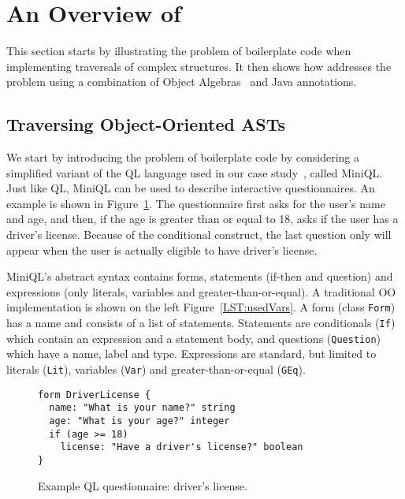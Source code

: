 \section{An Overview of \name}\label{subsec:overview}

This section starts by illustrating the problem of boilerplate code when implementing
traversals of complex structures. It then shows how \name addresses
the problem using a combination of Object Algebras~\cite{bruno12oa}
and Java annotations.

\subsection{Traversing Object-Oriented ASTs  }



We start by introducing the problem of boilerplate code by considering
a simplified variant of the QL language used in our case
study~\cite{gouseti14extensible}, called MiniQL.  Just like QL, MiniQL
can be used to describe interactive questionnaires. An example is
shown in Figure~\ref{driver_license}.  The questionnaire first asks
for the user's name and age, and then, if the age is greater than or
equal to 18, asks if the user has a driver's license.  Because of the
conditional construct, the last question only will appear when the
user is actually eligible to have driver's license.

MiniQL's abstract syntax contains forms, statements (if-then and question) and expressions (only literals, variables and greater-than-or-equal).
A traditional OO implementation is shown on the left Figure~\ref{LST:usedVars}.
A form (class \lstinline{Form}) has a name and consists of a list of statements.
Statements are conditionals (\lstinline{If}) which contain an expression and a statement body, and questions (\lstinline{Question}) which have a name, label and type. Expressions are standard, but limited to literals (\lstinline{Lit}), variables (\lstinline{Var}) and greater-than-or-equal (\lstinline{GEq}).

\begin{figure}[t]
\nocaptionrule
\begin{lstlisting}[language=ql]
form DriverLicense {
  name: "What is your name?" string
  age: "What is your age?" integer
  if (age >= 18)
    license: "Have a driver's license?" boolean
}
\end{lstlisting}
\caption{Example QL questionnaire: driver's license.}
\label{driver_license}
\end{figure}

